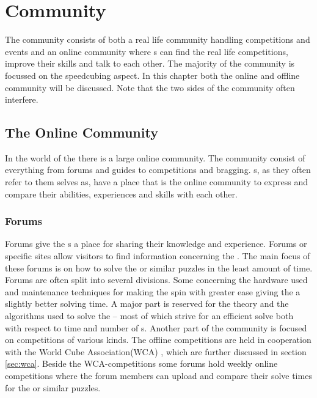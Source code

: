 \chapter{Community}

The \rubik{} community consists of both a real life community handling competitions and events and an online community where \cuber{}s can find the real life competitions, improve their skills and talk to each other. The majority of the community is focussed on the speedcubing aspect. In this chapter both the online and offline community will be discussed. Note that the two sides of the community often interfere.

\section{The Online Community}
In the world of the \rubik{} there is a large online community. The community consist of everything from forums and guides to competitions and bragging. s, as they often refer to them selves as, have a place that is the online community to express and compare their abilities, experiences and skills with each other. 
\subsection{Forums}
Forums give the \cuber{}s a place for sharing their knowledge and experience\cite{speedsolving.com}\cite{speedcubing.dk}\cite{wca}. Forums or specific \rubik{} sites allow visitors to find information concerning the \rubik{}. The main focus of these forums is on how to solve the \rubik{} or similar puzzles in the least amount of time. Forums are often split into several divisions. Some concerning the hardware used and maintenance techniques for making the \rubik{} spin with greater ease giving the \cuber{} a slightly better solving time.
A major part is reserved for the theory and the algorithms used to solve the \rubik{} -- most of which strive for an efficient solve both with respect to time and number of \twist{}s.
Another part of the community is focused on competitions of various kinds. The offline competitions are held in cooperation with the World Cube Association(WCA) \cite{wca}, which are further discussed in section \ref{sec:wca}. Beside the WCA-competitions some forums hold weekly online competitions where the forum members can upload and compare their solve times for the \rubik{} or similar puzzles. 

